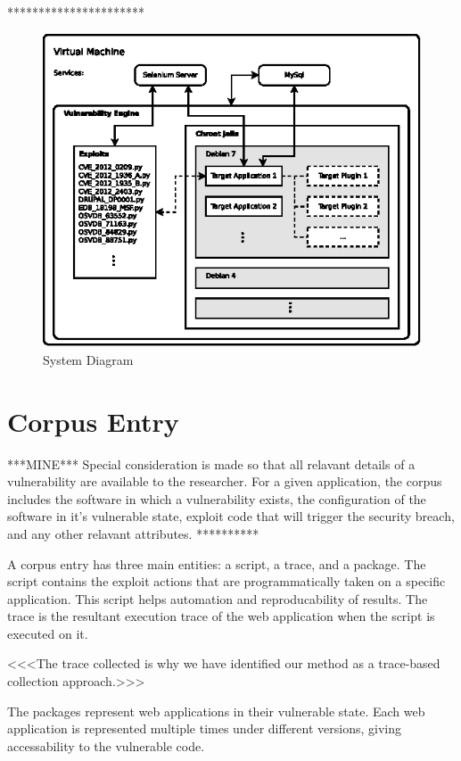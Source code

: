 \documentclass[letterpaper,twocolumn,10pt]{article}
\begin{document}
**********************
\begin{figure}[!tp]
\begin{center}
\includegraphics[scale=1.17]{system_diagram.eps}
\end{center}
\caption{System Diagram}
\end{figure}


\section{Corpus Entry}

***MINE***
Special consideration is made so that all relavant details of a vulnerability are available to the researcher. For a given application, the corpus includes the software in which a vulnerability exists, the configuration of the software in it's vulnerable state, exploit code that will trigger the security breach, and any other relavant attributes.
**********

A corpus entry has three main entities: a script, a trace, and a package.  The script contains the exploit actions that are programmatically taken on a specific application.  This script helps automation and reproducability of results.  The trace is the resultant execution trace of the web application when the script is executed on it.  

<<<The trace collected is why we have identified our method as a trace-based collection approach.>>>

  The packages represent web applications in their vulnerable state.  Each web application is represented multiple times under different versions, giving accessability to the vulnerable code.
\end{document}
